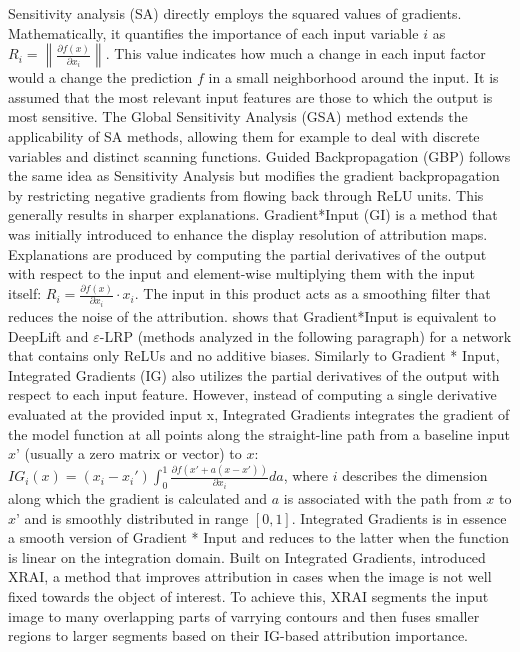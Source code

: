 \documentclass[journal]{IEEEtran}
\begin{document}
Sensitivity analysis (SA) \cite{Simonyan2014} \cite{Baehrens2010} \cite{Li2016a} \cite{Yuan2019} \cite{Baldassarre2019} \cite{Vilamala2017} \cite{Leino2019}  \cite{Cortez2013} directly employs the squared values of gradients. Mathematically, it quantifies the importance of each input variable $i$ as $R_i=\left\| \frac{\partial f(x)}{\partial x_i} \right\|$. This value indicates how much a change in each input factor would a change the prediction $f$ in a small neighborhood around the input. It is assumed that the most relevant input features are those to which the output is most sensitive. 
The Global Sensitivity Analysis (GSA) method \cite{Cortez2011} extends the applicability of SA methods, allowing them for example to deal with discrete variables and distinct scanning functions.
Guided Backpropagation (GBP) \cite{Baldassarre2019} \cite{Springenberg2015} follows the same idea as Sensitivity Analysis but modifies the gradient backpropagation by restricting negative gradients from flowing back through ReLU units. This generally results in sharper explanations.
Gradient*Input (GI) \cite{Shrikumar2017} is a method that was initially introduced to enhance the display resolution of attribution maps. Explanations are produced by computing the partial derivatives of the output with respect to the input and element-wise multiplying them with the input itself: $R_i=\frac{\partial f(x)}{\partial x_i} \cdot x_i$. The input in this product acts as a smoothing filter that reduces the noise of the attribution. \cite{Ancona2017a} shows that Gradient*Input is equivalent to DeepLift and $\varepsilon$-LRP (methods analyzed in the following paragraph) for a network that contains only ReLUs and no additive biases. 
Similarly to Gradient * Input, Integrated Gradients (IG) \cite{Sundararajan2017} also utilizes the partial derivatives of the output with respect to each input feature. However, instead of computing a single derivative evaluated at the provided input x, Integrated Gradients integrates the gradient of the model function at all points along the straight-line path from a baseline input $x’$ (usually a zero matrix or vector) to $x$: $IG_i(x)=(x_i-x_i') \int_0^1 \frac{\partial f(x'+a(x-x'))}{\partial x_i}da$, where $i$ describes the dimension along which the gradient is calculated and $a$ is associated with the path from $x$ to $x’$ and is smoothly distributed in range $[0,1]$. Integrated Gradients is in essence a smooth version of Gradient * Input and reduces to the latter when the function is linear on the integration domain.
Built on Integrated Gradients, \cite{Kapishnikov2019} introduced XRAI, a method that improves attribution in cases when the image is not well fixed towards the object of interest. To achieve this, XRAI segments the input image to many overlapping parts of varrying contours and then fuses smaller regions to larger segments based on their IG-based attribution importance.
\end{document}
